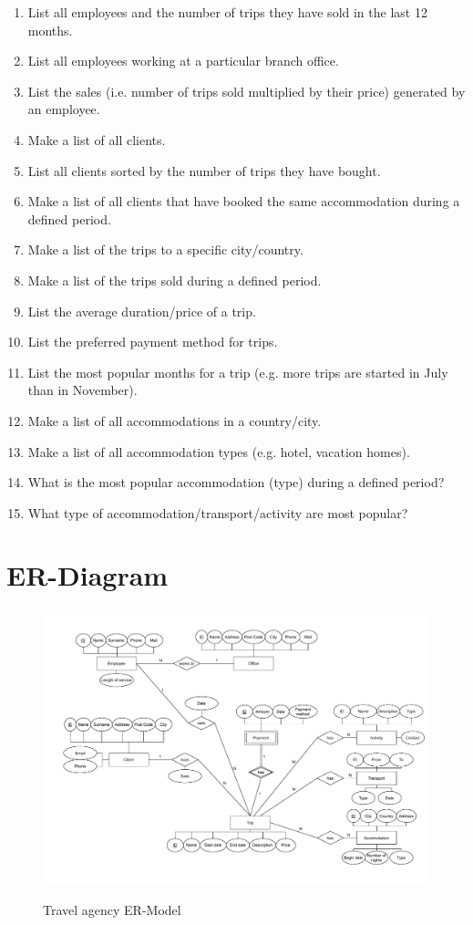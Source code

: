 \documentclass{article}
\begin{document}
			\begin{enumerate}
				\item List all employees and the number of trips they have sold in the last 12 months.
				\item List all employees working at a particular branch office.
				\item List the sales (i.e. number of trips sold multiplied by their price) generated by an employee. 
				\item Make a list of all clients.
				\item List all clients sorted by the number of trips they have bought.
				\item Make a list of all clients that have booked the same accommodation 	during a defined period.
				\item Make a list of the trips to a specific city/country. 
				\item Make a list of the trips sold during a defined period.
				\item List the average duration/price of a trip.
				\item List the preferred payment method for trips.
				\item List the most popular months for a trip (e.g. more trips are started in July than in November).
				\item Make a list of all accommodations in a country/city. 
				\item Make a list of all accommodation types (e.g. hotel, vacation homes).
				\item What is the most popular accommodation (type) during a defined period?
				\item What type of accommodation/transport/activity are most popular?
			\end{enumerate}	

	\newpage
	
	\section*{ER-Diagram}
	\begin{figure}[htbp]
		\centering
			\includegraphics[width=1.15\textwidth, angle=90]{../Proposition 2.pdf}
		\label{ER-Model}
		\caption{Travel agency ER-Model}
	\end{figure}
	
\end{document}
